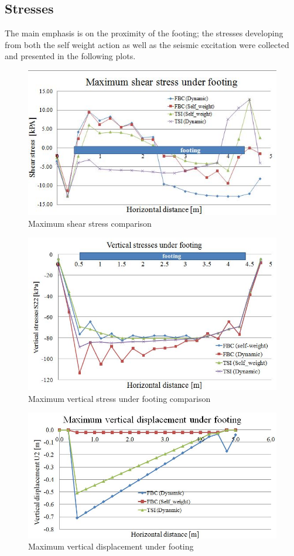 \newpage
\subsection{Stresses}

The main emphasis is on the proximity of the footing; the stresses developing from both the self weight action as well as the seismic excitation were collected and presented in the following plots. 
\begin{figure}[!h]
	\centering
	\includegraphics[width=0.7\linewidth]{"shear stress"}
	\caption{Maximum shear stress comparison}
	\label{shearrr}
\end{figure}

\begin{figure}[!h]
	\centering
	\includegraphics[width=0.7\linewidth]{"vert stresses"}
	\caption{Maximum vertical stress under footing comparison}
	\label{vert}
\end{figure}

\begin{figure}[!h]
	\centering
	\includegraphics[width=0.7\linewidth]{"displacement"}
	\caption{Maximum vertical displacement under footing}
	\label{inputacc}
\end{figure}

